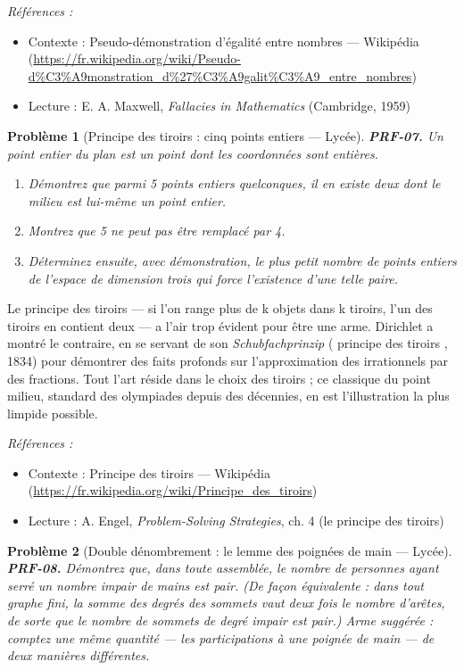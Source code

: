 \documentclass[11pt]{article}
\newtheorem{problem}{Problème}
\newenvironment{refs}{\par\small\noindent\emph{Références :}\begin{itemize}\setlength\itemsep{0pt}}{\end{itemize}\normalsize}
\begin{document}
\begin{refs}
\item Contexte : Pseudo-démonstration d'égalité entre nombres --- Wikipédia (\url{https://fr.wikipedia.org/wiki/Pseudo-d%C3%A9monstration_d%27%C3%A9galit%C3%A9_entre_nombres})
\item Lecture : E. A. Maxwell, \textit{Fallacies in Mathematics} (Cambridge, 1959)
\end{refs}

\bigskip

\begin{problem}[{Principe des tiroirs : cinq points entiers --- Lycée}]
\textbf{PRF-07.} Un point entier du plan est un point dont les coordonnées sont
entières.
\begin{enumerate}
\item[(a)] Démontrez que parmi 5 points entiers quelconques, il en existe deux dont le milieu est
lui-même un point entier.
\item[(b)] Montrez que 5 ne peut pas être remplacé par 4.
\item[(c)] Déterminez ensuite, avec démonstration, le plus petit nombre de points entiers de
l'espace de dimension trois qui force l'existence d'une telle paire.
\end{enumerate}

\end{problem}

\noindent Le principe des tiroirs --- si l'on range plus de k objets dans k tiroirs,
l'un des tiroirs en contient deux --- a l'air trop évident pour être une arme. Dirichlet a
montré le contraire, en se servant de son \textit{Schubfachprinzip} (\og{} principe des tiroirs \fg{},
1834) pour démontrer des faits profonds sur l'approximation des irrationnels par des
fractions. Tout l'art réside dans le choix des tiroirs ; ce classique du point milieu,
standard des olympiades depuis des décennies, en est l'illustration la plus limpide
possible.

\begin{refs}
\item Contexte : Principe des tiroirs --- Wikipédia (\url{https://fr.wikipedia.org/wiki/Principe_des_tiroirs})
\item Lecture : A. Engel, \textit{Problem-Solving Strategies}, ch. 4 (le principe des tiroirs)
\end{refs}

\bigskip

\begin{problem}[{Double dénombrement : le lemme des poignées de main --- Lycée}]
\textbf{PRF-08.} Démontrez que, dans toute assemblée, le nombre de
personnes ayant serré un nombre impair de mains est pair. (De façon équivalente : dans tout
graphe fini, la somme des degrés des sommets vaut deux fois le nombre d'arêtes, de sorte que
le nombre de sommets de degré impair est pair.) Arme suggérée : comptez une même quantité ---
les participations à une poignée de main --- de deux manières différentes.
\end{problem}
\end{document}
